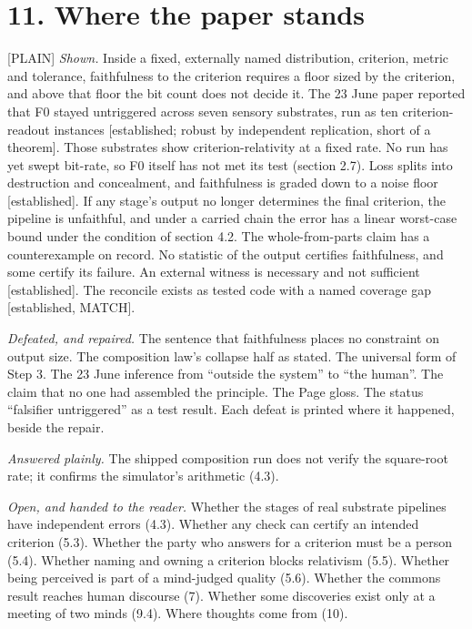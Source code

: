 \documentclass[11pt]{article}
\newcommand{\register}[1]{{\ttfamily\small #1}}
\begin{document}
\section*{11. Where the paper stands}

\register{[PLAIN]} \emph{Shown.} Inside a fixed, externally named distribution, criterion, metric and tolerance, faithfulness to the criterion requires a floor sized by the criterion, and above that floor the bit count does not decide it. The 23 June paper reported that F0 stayed untriggered across seven sensory substrates, run as ten criterion-readout instances [established; robust by independent replication, short of a theorem]. Those substrates show criterion-relativity at a fixed rate. No run has yet swept bit-rate, so F0 itself has not met its test (section 2.7). Loss splits into destruction and concealment, and faithfulness is graded down to a noise floor [established]. If any stage's output no longer determines the final criterion, the pipeline is unfaithful, and under a carried chain the error has a linear worst-case bound under the condition of section 4.2. The whole-from-parts claim has a counterexample on record. No statistic of the output certifies faithfulness, and some certify its failure. An external witness is necessary and not sufficient [established]. The reconcile exists as tested code with a named coverage gap [established, MATCH].

\emph{Defeated, and repaired.} The sentence that faithfulness places no constraint on output size. The composition law's collapse half as stated. The universal form of Step 3. The 23 June inference from ``outside the system'' to ``the human''. The claim that no one had assembled the principle. The Page gloss. The status ``falsifier untriggered'' as a test result. Each defeat is printed where it happened, beside the repair.

\emph{Answered plainly.} The shipped composition run does not verify the square-root rate; it confirms the simulator's arithmetic (4.3).

\emph{Open, and handed to the reader.} Whether the stages of real substrate pipelines have independent errors (4.3). Whether any check can certify an intended criterion (5.3). Whether the party who answers for a criterion must be a person (5.4). Whether naming and owning a criterion blocks relativism (5.5). Whether being perceived is part of a mind-judged quality (5.6). Whether the commons result reaches human discourse (7). Whether some discoveries exist only at a meeting of two minds (9.4). Where thoughts come from (10).
\end{document}
